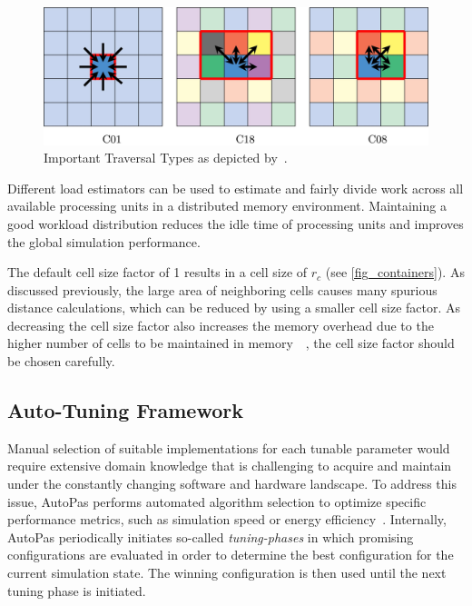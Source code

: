\documentclass[conference]{IEEEtran}
\begin{document}
\begin{description}[style=nextline]
        \begin{figure}[H]
            \centering
            \includegraphics[width=\columnwidth]{figures/traversals.jpg}
            \caption{Important Traversal Types as depicted by~\cite{NEWCOME2023115278}.}
            \label{fig_traversals}
        \end{figure}

    \item[Load Estimator]
        Different load estimators can be used to estimate and fairly divide work across all available processing units in a distributed memory environment. Maintaining a good workload distribution reduces the idle time of processing units and improves the global simulation performance.

    \item[Cell Size Factor]
        The default cell size factor of 1 results in a cell size of $r_c$ (see \autoref{fig_containers}). As discussed previously, the large area of neighboring cells causes many spurious distance calculations, which can be reduced by using a smaller cell size factor. As decreasing the cell size factor also increases the memory overhead due to the higher number of cells to be maintained in memory~\cite{menges2019}~\cite{Papula2020}, the cell size factor should be chosen carefully.
\end{description}


\subsection{Auto-Tuning Framework}

Manual selection of suitable implementations for each tunable parameter would require extensive domain knowledge that is challenging to acquire and maintain under the constantly changing software and hardware landscape. To address this issue, AutoPas performs automated algorithm selection to optimize specific performance metrics, such as simulation speed or energy efficiency~\cite{Gratl2022AutoPas}. Internally, AutoPas periodically initiates so-called \textit{tuning-phases} in which promising configurations are evaluated in order to determine the best configuration for the current simulation state. The winning configuration is then used until the next tuning phase is initiated.
\end{document}
